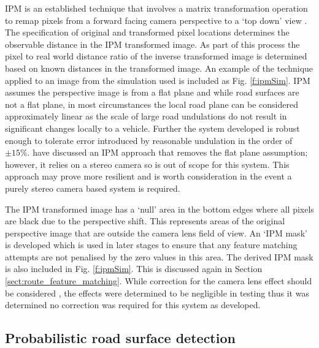 \documentclass[]{aiaa-tc}%
\begin{document}
IPM is an established technique that involves a matrix transformation operation to remap pixels from a forward facing camera perspective to a `top down' view \citep{compVisionTextbook}. The specification of original and transformed pixel locations determines the observable distance in the IPM transformed image. As part of this process the pixel to real world distance ratio of the inverse transformed image is determined based on known distances in the transformed image. An example of the technique applied to an image from the simulation used is included as Fig. \ref{f:ipmSim}. IPM assumes the perspective image is from a flat plane \citep{ipmForLaneTracking} and while road surfaces are not a flat plane, in most circumstances the local road plane can be considered approximately linear as the scale of large road undulations do not result in significant changes locally to a vehicle. Further the system developed is robust enough to tolerate error introduced by reasonable undulation in the order of $\pm 15\%$. \citet{extendedIPM} have discussed an IPM approach that removes the flat plane assumption; however, it relies on a stereo camera so is out of scope for this system. This approach may prove more resilient and is worth consideration in the event a purely stereo camera based system is required. 

The IPM transformed image has a `null' area in the bottom edges where all pixels are black due to the perspective shift. This represents areas of the original perspective image that are outside the camera lens field of view. An `IPM mask' is developed which is used in later stages to ensure that any feature matching attempts are not penalised by the zero values in this area. The derived IPM mask is also included in Fig. \ref{f:ipmSim}. This is discussed again in Section \ref{sect:route_feature_matching}. While correction for the camera lens effect should be considered \citep{fisheyeEffect}, the effects were determined to be negligible in testing thus it was determined no correction was required for this system as developed.

\subsection{Probabilistic road surface detection}\label{s:histogramRoadDetection}
\end{document}
